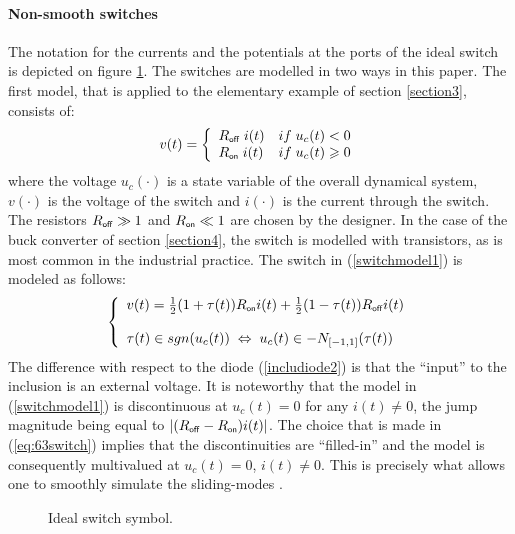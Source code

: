 \paragraph{Non-smooth switches}  The notation for the currents and the potentials at the ports of the ideal switch is depicted on figure \ref{fig:IDEAL_SWITCH}. The switches are modelled in two ways in this paper. The first model, that is applied to the elementary example of section \ref{section3}, consists of:
\begin{equation}\label{switchmodel1}
v(t)=\left\{\begin{array}{ll} R_\off\; i(t) & \mbox{if}\;u_{c}(t) < 0 \\   R_\on\; i(t) & \mbox{if}\;u_{c}(t) \geq  0  \end{array}\right.
\end{equation} 
where the voltage $u_{c}(\cdot)$ is a state variable of the overall dynamical system, $v(\cdot)$ is the voltage of the switch and $i(\cdot)$ is the current through the switch. The resistors $R_\off \gg 1$ and $R_\on \ll 1$ are chosen by the designer. In the case of the buck converter of section \ref{section4}, the switch is modelled with transistors, as is most common in the industrial practice. The switch in (\ref{switchmodel1}) is modeled as follows:
\begin{equation}
  \label{eq:63switch}
\left\{\begin{array}{l}
v(t)=\frac{1}{2}(1+\tau(t))R_\on i(t)+\frac{1}{2}(1-\tau(t))R_\off i(t)  \\ \\ \tau(t) \in \mbox{sgn}(u_{c}(t)) \; \Leftrightarrow \; u_{c}(t) \in -N_{[-1,1]}(\tau(t))
\end{array}\right.
\end{equation}
The difference with respect to the diode (\ref{includiode2}) is that the ``input'' to the inclusion is an external voltage. It is noteworthy that the model in (\ref{switchmodel1}) is discontinuous at $u_{c}(t)=0$ for any $i(t) \not = 0$, the jump magnitude being equal to $|(R_\off-R_\on)i(t)|$. The choice that is made in (\ref{eq:63switch}) implies that the discontinuities are ``filled-in'' and the model is consequently multivalued at $u_{c}(t)=0$,  $i(t) \not = 0$. This is precisely what allows one to smoothly simulate the sliding-modes \cite{Acary.Brogliato2009}. 



\begin{figure}
  \centering
  \scalebox{0.7}{
  
  }
  \caption{Ideal switch symbol.}
  \label{fig:IDEAL_SWITCH}
\end{figure}
 



